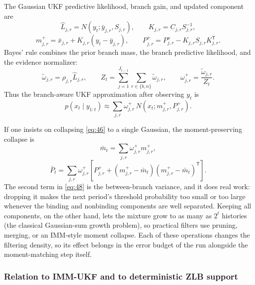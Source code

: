 \documentclass[11pt]{article}
\begin{document}
The Gaussian UKF predictive likelihood, branch gain, and updated component
are
\begin{equation}\label{eq:43}
 \widehat L_{j,r}=N(y_t;\bar y_{j,r},S_{j,r}),
 \qquad K_{j,r}=C_{j,r}S_{j,r}^{-1},
\end{equation}
\begin{equation}\label{eq:44}
 m^+_{j,r}=\bar x_{j,r}+K_{j,r}(y_t-\bar y_{j,r}),
 \qquad
 P^+_{j,r}=P^x_{j,r}-K_{j,r}S_{j,r}K_{j,r}^{\mathsf T}.
\end{equation}
Bayes' rule combines the prior branch mass, the branch predictive
likelihood, and the evidence normalizer:
\begin{equation}\label{eq:45}
 \widetilde\omega_{j,r}=\rho_{j,r}\widehat L_{j,r},
 \qquad
 Z_t=\sum_{j=1}^{J_{t-1}}\sum_{r\in\{b,n\}}\widetilde\omega_{j,r},
 \qquad
 \omega^+_{j,r}=\frac{\widetilde\omega_{j,r}}{Z_t}.
\end{equation}
Thus the branch-aware UKF approximation after observing $y_t$ is
\begin{equation}\label{eq:46}
 p(x_t\mid y_{1:t})
 \approx\sum_{j,r}\omega^+_{j,r}\,
 N(x_t;m^+_{j,r},P^+_{j,r}).
\end{equation}

If one insists on collapsing \eqref{eq:46} to a single Gaussian, the
moment-preserving collapse is
\begin{equation}\label{eq:47}
 \bar m_t=\sum_{j,r}\omega^+_{j,r}m^+_{j,r},
\end{equation}
\begin{equation}\label{eq:48}
 \bar P_t=\sum_{j,r}\omega^+_{j,r}
 \left[P^+_{j,r}+
 (m^+_{j,r}-\bar m_t)(m^+_{j,r}-\bar m_t)^{\mathsf T}\right].
\end{equation}
The second term in \eqref{eq:48} is the between-branch variance, and it does
real work: dropping it makes the next period's
threshold probability too small or too large whenever the binding and
nonbinding components are well separated. Keeping all components, on the
other hand, lets the mixture grow to as many as $2^t$ histories (the
classical Gaussian-sum growth problem), so practical filters use pruning,
merging, or an IMM-style moment collapse. Each of these operations changes
the filtering density, so its effect belongs in the error budget of the run
alongside the moment-matching step itself.

\subsubsection{Relation to IMM-UKF and to deterministic ZLB support}
\label{sec:ukf-imm}
\end{document}
